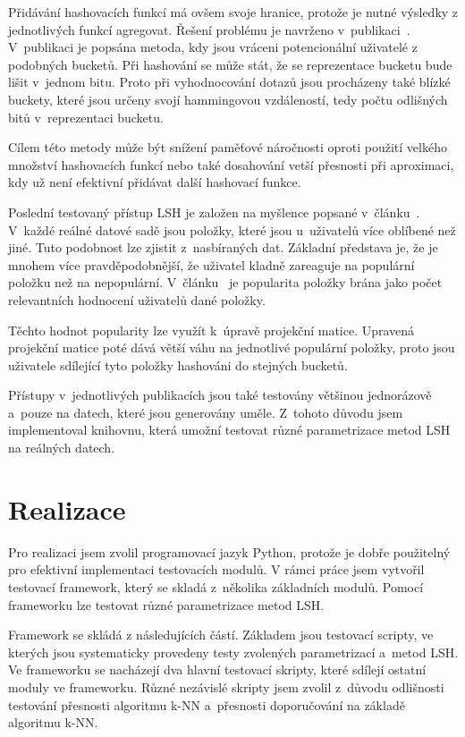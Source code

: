 \documentclass[11pt]{article}
\begin{document}
Přidávání hashovacích funkcí má ovšem svoje hranice, protože je nutné výsledky z jednotlivých funkcí agregovat. Řešení problému je navrženo v~publikaci~\cite{lv2007multi}. V~publikaci je popsána metoda, kdy jsou vráceni potencionální uživatelé z podobných bucketů. Při hashování se může stát, že se reprezentace bucketu bude lišit v~jednom bitu. Proto při vyhodnocování dotazů jsou procházeny také blízké buckety, které jsou určeny svojí hammingovou vzdáleností, tedy počtu odlišných bitů v~reprezentaci bucketu. 

Cílem této metody může být snížení paměťové náročnosti oproti použití velkého množství hashovacích funkcí nebo také dosahování vetší přesnosti při aproximaci, kdy už není efektivní přidávat další hashovací funkce.

Poslední testovaný přístup LSH je založen na myšlence popsané v~článku~\cite{Steck:2011:IPR:2043932.2043957}. V~každé reálné datové sadě jsou položky, které jsou u~uživatelů více oblíbené než jiné. Tuto podobnost lze zjistit z~nasbíraných dat. Základní představa je, že je mnohem více pravděpodobnější, že uživatel kladně zareaguje na populární položku než na nepopulární. V~článku~\cite{Steck:2011:IPR:2043932.2043957} je popularita položky brána jako počet relevantních hodnocení uživatelů dané položky. 

Těchto hodnot popularity lze využít k~úpravě projekční matice. Upravená projekční matice poté dává větší váhu na jednotlivé populární položky, proto jsou uživatele sdílející tyto položky hashováni do stejných bucketů.

Přístupy v~jednotlivých publikacích jsou také testovány většinou jednorázově a~pouze na datech, které jsou generovány uměle. Z~tohoto důvodu jsem implementoval knihovnu, která umožní testovat různé parametrizace metod LSH na reálných datech.

\section{Realizace}
Pro realizaci jsem zvolil programovací jazyk Python, protože je dobře použitelný pro efektivní implementaci testovacích modulů. V rámci práce jsem vytvořil testovací framework, který se skladá z~několika základních modulů. Pomocí frameworku lze testovat různé parametrizace metod LSH. 

Framework se skládá z následujících částí. Základem jsou testovací scripty, ve kterých jsou systematicky provedeny testy zvolených parametrizací a~metod LSH. Ve frameworku se nacházejí dva hlavní testovací skripty, které sdílejí ostatní moduly ve frameworku. Různé nezávislé skripty jsem zvolil z~důvodu odlišnosti testování přesnosti algoritmu k-NN a~přesnosti doporučování na základě algoritmu k-NN. 
\end{document}
